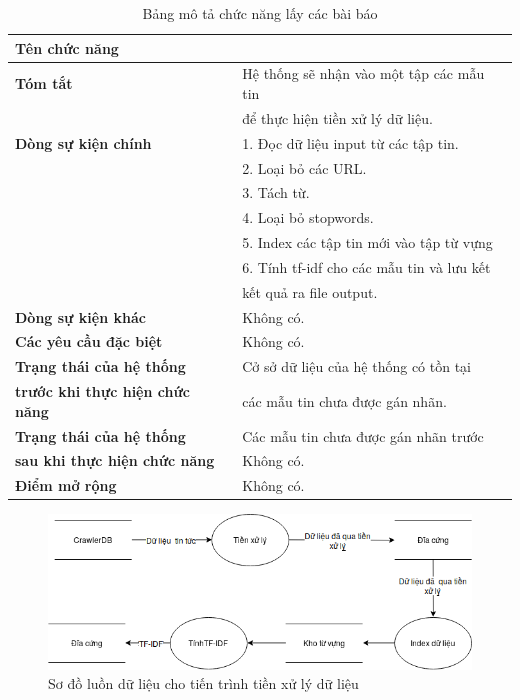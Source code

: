   \begin{table}[H]
    \centering
    \setlength{\tabcolsep}{12pt}
    \begin{tabular}{ll} \toprule%
      \textbf{Tên chức năng}  &  \\ \toprule%
      \textbf{Tóm tắt}   &  Hệ thống sẽ nhận vào một tập các mẫu tin \\
                 & để thực hiện tiền xử lý dữ liệu.\\ \midrule

      \textbf{Dòng sự kiện chính}
                                  & 1. Đọc dữ liệu input từ các tập tin. \\
                                  & 2. Loại bỏ các URL. \\
                                  & 3. Tách từ.\\ 
                                  & 4. Loại bỏ stopwords.\\
                                  & 5. Index các tập tin mới vào tập từ vựng \\
                                  & 6. Tính tf-idf cho các mẫu tin và lưu kết \\
                                  & kết quả ra file output. \\ \midrule
      \textbf{Dòng sự kiện khác} & Không có. \\ \midrule
      \textbf{Các yêu cầu đặc biệt} & Không có. \\ \midrule
      \textbf{Trạng thái của hệ thống} & Cở sở dữ liệu của hệ thống có tồn tại \\
      \textbf{trước khi thực hiện chức năng} & các mẫu tin chưa được gán nhãn.\\ \midrule
      \textbf{Trạng thái của hệ thống} & Các mẫu tin chưa được gán nhãn trước \\
      \textbf{sau khi thực hiện chức năng} & Không có. \\ \midrule
      \textbf{Điểm mở rộng} & Không có. \\ \bottomrule
    \end{tabular}
    \caption{Bảng mô tả chức năng lấy các bài báo}
  \end{table}
\begin{figure}[H]
	\centering
	\includegraphics[width=0.9\linewidth]{Chapter3/Chapter3Figs/Preprocess.png}
	\caption{Sơ đồ luồn dữ liệu cho tiến trình tiền xử lý dữ liệu}
	\label{fig:classifyprocess}
\end{figure}
